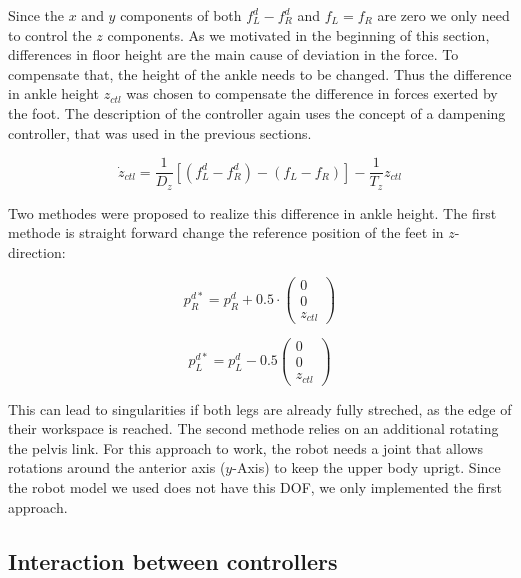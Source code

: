 \documentclass[english,ngerman]{KITreprt}
\begin{document}
Since the $x$ and $y$ components of both $f^d_L - f^d_R$ and $f_L = f_R$
are zero we only need to control the $z$ components. As we motivated in
the beginning of this section, differences in floor height are the main
cause of deviation in the force. To compensate that, the height of the
ankle needs to be changed. Thus the difference in ankle height $z_{ctl}$
was chosen to compensate the difference in forces exerted by the foot.
The description of the controller again uses the concept of a dampening
controller, that was used in the previous sections.

\begin{equation}
\dot{z}_{ctl} = \frac{1}{D_z} [(f^d_L - f^d_R) - (f_L - f_R)] - \frac{1}{T_z} z_{ctl}
\end{equation}

Two methodes were proposed to realize this difference in ankle height.
The first methode is straight forward change the reference position of
the feet in $z$-direction:

\begin{equation}
p^{d*}_R = p^d_R + 0.5 \cdot \left(\begin{array}{c}0 \\ 0 \\ z_{ctl} \end{array}\right)
\end{equation}

\begin{equation}
p^{d*}_L = p^d_L - 0.5 \left(\begin{array}{c}0 \\ 0 \\ z_{ctl} \end{array}\right)
\end{equation}

This can lead to singularities if both legs are already fully streched,
as the edge of their workspace is reached. The second methode relies on
an additional rotating the pelvis link. For this approach to work, the
robot needs a joint that allows rotations around the anterior axis
($y$-Axis) to keep the upper body uprigt. Since the robot model we used
does not have this DOF, we only implemented the first approach.

\subsection{Interaction between
controllers}\label{interaction-between-controllers}
\end{document}
